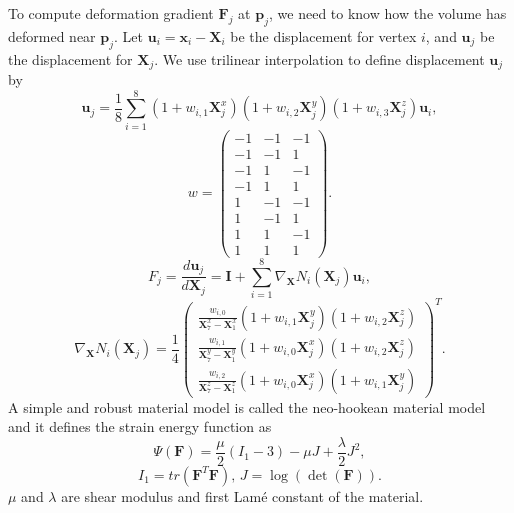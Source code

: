 \documentclass{article}
\newcommand{\mbF}{\mathbf{F}}
\newcommand{\mbI}{\mathbf{I}}
\newcommand{\mbp}{\mathbf{p}}
\newcommand{\mbX}{\mathbf{X}}
\newcommand{\mbx}{\mathbf{x}}
\newcommand{\mbu}{\mathbf{u}}
\begin{document}
	To compute deformation gradient $\mbF_j$ at $\mbp_j$, we need to know how the volume has deformed
	near $\mbp_j$. Let $\mbu_i=\mbx_i-\mbX_i$ be the displacement for vertex $i$, and $\mbu_j$
	be the displacement for $\mbX_j$.
	We use trilinear interpolation to define displacement $\mbu_j$ by
	\[\mbu_j=\frac{1}{8}\sum_{i=1}^8(1+w_{i,1}\mbX_j^x)(1+w_{i,2}\mbX_j^y)(1+w_{i,3}\mbX_j^z)\mbu_i,\]
	\[
	w=\begin{pmatrix}
	-1 & -1 & -1\\
	-1 & -1 & 1\\
	-1 & 1 & -1\\
	-1 & 1 & 1\\
	1 & -1 & -1\\
	1 & -1 & 1\\
	1 & 1 & -1\\
	1 & 1 & 1
	\end{pmatrix}.
	\]
	\[
	F_j=\frac{d\mbu_j}{d\mbX_j} = \mbI + \sum_{i=1}^8\nabla_{\mbX} N_i(\mbX_j)\mbu_i,
	\]
	\[
	\nabla_{\mbX}N_i(\mbX_j) = \frac{1}{4}
	\begin{pmatrix}
	\frac{w_{i,0}}{\mbX_7^x-\mbX_1^x}(1+w_{i,1}\mbX_j^y)(1+w_{i,2}\mbX_j^z)\\
	\frac{w_{i,1}}{\mbX_7^y-\mbX_1^y}(1+w_{i,0}\mbX_j^x)(1+w_{i,2}\mbX_j^z)\\
	\frac{w_{i,2}}{\mbX_7^z-\mbX_1^z}(1+w_{i,0}\mbX_j^x)(1+w_{i,1}\mbX_j^y)
	\end{pmatrix}^T.
	\]
	A simple and robust material model is called the neo-hookean material
	model and it defines the strain energy function as
	\[
	\Psi(\mbF)=\frac{\mu}{2}(I_1-3) - \mu J + \frac{\lambda}{2}J^2,
	\]
	\[I_1=tr(\mbF^T\mbF),\, J=\log(\det(\mbF)).
	\]
	$\mu$ and $\lambda$ are shear modulus and first Lam\'{e} constant of the material.
\end{document}
